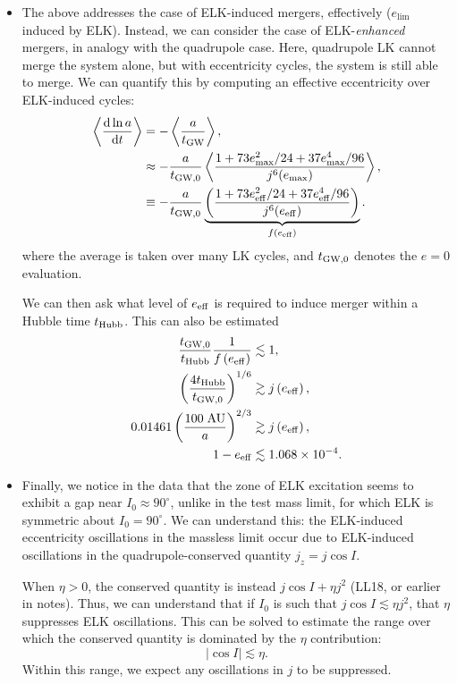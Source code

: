 \documentclass[11pt,
        usenames, %
        dvipsnames %
    ]{article}
\newcommand*{\rd}[2]{\frac{\mathrm{d}#1}{\mathrm{d}#2}}
\newcommand*{\abs}[1]{\left|#1\right|}
\newcommand*{\ev}[1]{\left\langle#1\right\rangle}
\newcommand*{\p}[1]{\left(#1\right)}
\begin{document}
\begin{itemize}
    \item The above addresses the case of ELK-induced mergers, effectively
        ($e_{\lim}$ induced by ELK). Instead, we can consider the case of
        ELK-\emph{enhanced} mergers, in analogy with the quadrupole case. Here,
        quadrupole LK cannot merge the system alone, but with eccentricity
        cycles, the system is still able to merge. We can quantify this by
        computing an effective eccentricity over ELK-induced cycles:
        \begin{align}
            \ev{\rd{\ln a}{t}} &= -\ev{\frac{a}{t_{\rm GW}}},\\
                &\approx -\frac{a}{t_{\rm GW, 0}}
                    \ev{\frac{1 + 73e_{\max}^2/24 + 37e_{\max}^4/96}
                        {j^6(e_{\max})}},\\
                &\equiv -\frac{a}{t_{\rm GW,0}}
                    \underbrace{\p{\frac{1 + 73e_{\rm eff}^2/24 + 37e_{\rm
                    eff}^4/96}{j^6(e_{\rm eff})}}}_{f\p{e_{\rm eff}}}.
        \end{align}
        where the average is taken over many LK cycles, and $t_{\rm GW, 0}$
        denotes the $e = 0$ evaluation.

        We can then ask what level of $e_{\rm eff}$ is required to induce
        merger within a Hubble time $t_{\rm Hubb}$. This can also be estimated
        \begin{align}
            \frac{t_{\rm GW, 0}}{t_{\rm Hubb}}\frac{1}{f\p{e_{\rm eff}}}
                &\lesssim 1,\\
            \p{\frac{4t_{\rm Hubb}}{t_{\rm GW, 0}}}^{1/6}
                &\gtrsim j\p{e_{\rm eff}},\\
            0.01461\p{\frac{100\;\mathrm{AU}}{a}}^{2/3} &\gtrsim
                j\p{e_{\rm eff}},\\
            1 - e_{\rm eff} &\lesssim 1.068 \times 10^{-4}.
        \end{align}

    \item Finally, we notice in the data that the zone of ELK excitation seems
        to exhibit a gap near $I_0 \approx 90^\circ$, unlike in the test mass
        limit, for which ELK is symmetric about $I_0 = 90^\circ$. We can
        understand this: the ELK-induced eccentricity oscillations in the
        massless limit occur due to ELK-induced oscillations in the
        quadrupole-conserved quantity $j_z = j\cos I$.

        When $\eta > 0$, the conserved quantity is instead $j\cos I + \eta j^2$
        (LL18, or earlier in notes). Thus, we can understand that if $I_0$ is
        such that $j\cos I \lesssim \eta j^2$, that $\eta$ suppresses ELK
        oscillations. This can be solved to estimate the range over which the
        conserved quantity is dominated by the $\eta$ contribution:
        \begin{equation}
            \abs{\cos I} \lesssim \eta.
        \end{equation}
        Within this range, we expect any oscillations in $j$ to be suppressed.


\end{itemize}
\end{document}
